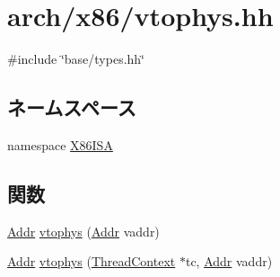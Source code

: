 \hypertarget{x86_2vtophys_8hh}{
\section{arch/x86/vtophys.hh}
\label{x86_2vtophys_8hh}
}
{\ttfamily \#include \char`\"{}base/types.hh\char`\"{}}\par
\subsection*{ネームスペース}
\begin{DoxyCompactItemize}
\item 
namespace \hyperlink{namespaceX86ISA}{X86ISA}
\end{DoxyCompactItemize}
\subsection*{関数}
\begin{DoxyCompactItemize}
\item 
\hyperlink{base_2types_8hh_af1bb03d6a4ee096394a6749f0a169232}{Addr} \hyperlink{namespaceX86ISA_a3828815371ad2b0a1be60abdcb405cf9}{vtophys} (\hyperlink{base_2types_8hh_af1bb03d6a4ee096394a6749f0a169232}{Addr} vaddr)
\item 
\hyperlink{base_2types_8hh_af1bb03d6a4ee096394a6749f0a169232}{Addr} \hyperlink{namespaceX86ISA_ad4bbbca3210dee66152520984c3aac6a}{vtophys} (\hyperlink{classThreadContext}{ThreadContext} $\ast$tc, \hyperlink{base_2types_8hh_af1bb03d6a4ee096394a6749f0a169232}{Addr} vaddr)
\end{DoxyCompactItemize}

